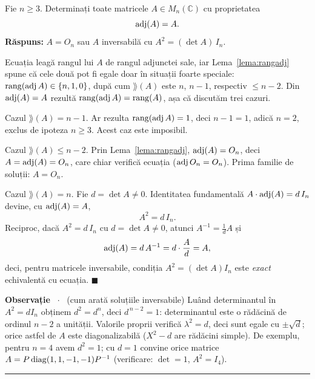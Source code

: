 Fie $n \ge 3$. Determinați toate matricele $A \in M_n(\mathbb{C})$ cu proprietatea
\[
  \operatorname{adj}(A) = A.
\]
\sol \textbf{Răspuns:} $A = O_n$ sau $A$ inversabilă cu $A^2 = (\det A)\, I_n$.

Ecuația leagă rangul lui $A$ de rangul adjunctei sale, iar Lema~\ref{lema:rangadj} spune că cele două pot fi egale doar în situații foarte speciale: $\operatorname{rang}(\operatorname{adj} A) \in \{n, 1, 0\}$, după cum $\rang(A)$ este $n$, $n-1$, respectiv $\le n-2$. Din $\operatorname{adj}(A) = A$ rezultă $\operatorname{rang}(\operatorname{adj} A) = \operatorname{rang}(A)$, așa că discutăm trei cazuri.

Cazul $\rang(A) = n-1$. Ar rezulta $\operatorname{rang}(\operatorname{adj} A) = 1$, deci $n - 1 = 1$, adică $n = 2$, exclus de ipoteza $n \ge 3$. Acest caz este imposibil.

Cazul $\rang(A) \le n-2$. Prin Lema~\ref{lema:rangadj}, $\operatorname{adj}(A) = O_n$, deci $A = \operatorname{adj}(A) = O_n$, care chiar verifică ecuația ($\operatorname{adj} O_n = O_n$). Prima familie de soluții: $A = O_n$.

Cazul $\rang(A) = n$. Fie $d = \det A \ne 0$. Identitatea fundamentală $A \cdot \operatorname{adj}(A) = d\, I_n$ devine, cu $\operatorname{adj}(A) = A$,
\[
  A^2 = d\, I_n.
\]
Reciproc, dacă $A^2 = d\, I_n$ cu $d = \det A \ne 0$, atunci $A^{-1} = \frac{1}{d} A$ și
\[
  \operatorname{adj}(A) = d\, A^{-1} = d \cdot \frac{A}{d} = A,
\]
deci, pentru matricele inversabile, condiția $A^2 = (\det A) I_n$ este \emph{exact} echivalentă cu ecuația. $\blacksquare$

\medskip
\noindent\textnormal{\textbf{Observație} \ $\cdot$ \ (cum arată soluțiile inversabile) Luând determinantul în $A^2 = d I_n$ obținem $d^2 = d^n$, deci $d^{\,n-2} = 1$: determinantul este o rădăcină de ordinul $n-2$ a unității. Valorile proprii verifică $\lambda^2 = d$, deci sunt egale cu $\pm\sqrt{d}$; orice astfel de $A$ este diagonalizabilă ($X^2 - d$ are rădăcini simple). De exemplu, pentru $n = 4$ avem $d^2 = 1$; cu $d = 1$ convine orice matrice $A = P \operatorname{diag}(1, 1, -1, -1) P^{-1}$ (verificare: $\det = 1$, $A^2 = I_4$).}
\vspace{1mm}\hrule

